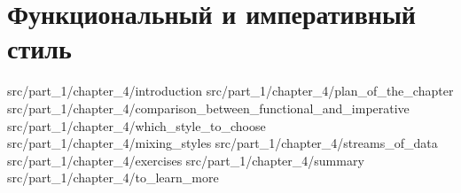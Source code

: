 \chapter{Функциональный и императивный стиль}

 {src/part_1/chapter_4/introduction}
 {src/part_1/chapter_4/plan_of_the_chapter}
 {src/part_1/chapter_4/comparison_between_functional_and_imperative}
 {src/part_1/chapter_4/which_style_to_choose}
 {src/part_1/chapter_4/mixing_styles}
 {src/part_1/chapter_4/streams_of_data}
 {src/part_1/chapter_4/exercises}
 {src/part_1/chapter_4/summary}
 {src/part_1/chapter_4/to_learn_more}
